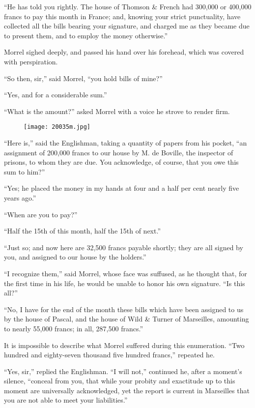 “He has told you rightly. The house of Thomson \& French had 300,000 or
400,000 francs to pay this month in France; and, knowing your strict
punctuality, have collected all the bills bearing your signature, and
charged me as they became due to present them, and to employ the money
otherwise.”

Morrel sighed deeply, and passed his hand over his forehead, which was
covered with perspiration.

“So then, sir,” said Morrel, “you hold bills of mine?”

“Yes, and for a considerable sum.”

“What is the amount?” asked Morrel with a voice he strove to render
firm.

\begin{figure}[ht]
\texttt{[image: 20035m.jpg]}
\end{figure}

“Here is,” said the Englishman, taking a quantity of papers from his
pocket, “an assignment of 200,000 francs to our house by M. de Boville,
the inspector of prisons, to whom they are due. You acknowledge, of
course, that you owe this sum to him?”

“Yes; he placed the money in my hands at four and a half per cent
nearly five years ago.”

“When are you to pay?”

“Half the 15th of this month, half the 15th of next.”

“Just so; and now here are 32,500 francs payable shortly; they are all
signed by you, and assigned to our house by the holders.”

“I recognize them,” said Morrel, whose face was suffused, as he thought
that, for the first time in his life, he would be unable to honor his
own signature. “Is this all?”

“No, I have for the end of the month these bills which have been
assigned to us by the house of Pascal, and the house of Wild \& Turner
of Marseilles, amounting to nearly 55,000 francs; in all, 287,500
francs.”

It is impossible to describe what Morrel suffered during this
enumeration. “Two hundred and eighty-seven thousand five hundred
francs,” repeated he.

“Yes, sir,” replied the Englishman. “I will not,” continued he, after a
moment’s silence, “conceal from you, that while your probity and
exactitude up to this moment are universally acknowledged, yet the
report is current in Marseilles that you are not able to meet your
liabilities.”

